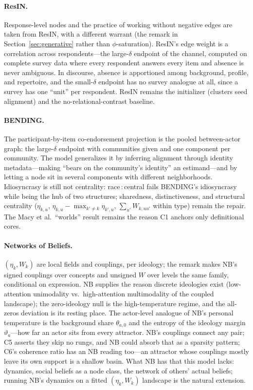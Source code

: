 \documentclass[11pt]{article}
\newcommand{\1}{\mathbb{1}}
\newcommand{\node}[2]{\textsf{#1\,:\,#2}}
\begin{document}
\paragraph{ResIN.} Response-level nodes and the practice of working without negative edges are taken from ResIN, with a different warrant (the remark in Section~\ref{sec:generative} rather than $\phi$-saturation). ResIN's edge weight is a correlation across respondents---the large-$\delta$ endpoint of the channel, computed on complete survey data where every respondent answers every item and absence is never ambiguous. In discourse, absence is apportioned among background, profile, and repertoire, and the small-$\delta$ endpoint has no survey analogue at all, since a survey has one ``unit'' per respondent. ResIN remains the initializer (clusters seed alignment) and the no-relational-contrast baseline.

\paragraph{BENDING.} The participant-by-item co-endorsement projection is the pooled between-actor graph: the large-$\delta$ endpoint with communities given and one component per community. The model generalizes it by inferring alignment through identity metadata---making ``bears on the community's identity'' an estimand---and by letting a node sit in several components with different neighborhoods. Idiosyncrasy is still not centrality: \node{race}{central} fails BENDING's idiosyncrasy while being the hub of two structures; sharedness, distinctiveness, and structural centrality ($\eta_{k,u}$, $\eta_{k,u}-\max_{k'\ne k}\eta_{k',u}$, $\sum_{u'}W_{k,uu'}$ within type) remain the repair. The Macy et al.\ ``worlds'' result remains the reason C1 anchors only definitional cores.

\paragraph{Networks of Beliefs.} $(\eta_k,W_k)$ are local fields and couplings, per ideology; the remark makes NB's signed couplings over concepts and unsigned $W$ over levels the same family, conditional on expression. NB supplies the reason discrete ideologies exist (low-attention unimodality vs.\ high-attention multimodality of the coupled landscape); the zero-ideology null is the high-temperature regime, and the all-zeros deviation is its resting place. The actor-level analogue of NB's personal temperature is the background share $\theta_{a,0}$ and the entropy of the ideology margin $\vartheta_a$---how far an actor sits from every attractor. NB's couplings connect any pair; C5 asserts they skip no rungs, and NB could absorb that as a sparsity pattern; C6's coherence ratio has an NB reading too---an attractor whose couplings mostly leave its own support is a shallow basin. What NB has that this model lacks: dynamics, social beliefs as a node class, the network of others' actual beliefs; running NB's dynamics on a fitted $(\eta_k,W_k)$ landscape is the natural extension.
\end{document}
